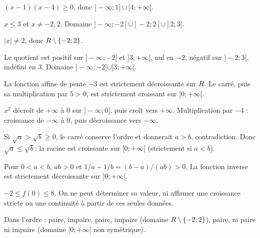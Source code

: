 \begin{corrige}\label{sol-t11s-c01-e09}$(x-1)(x-4)\ge0$, donc $]-\infty;1]\cup[4;+\infty[$.
\end{corrige}
\begin{corrige}\label{sol-t11s-c01-e10}$x\le3$ et $x\ne-2,2$. Domaine $]-\infty;-2[\cup]-2;2[\cup]2;3]$.
\end{corrige}
\begin{corrige}\label{sol-t11s-c01-e11}$|x|\ne2$, donc $R\setminus\{-2;2\}$.
\end{corrige}
\begin{corrige}\label{sol-t11s-c01-e12}Le quotient est positif sur $]-\infty;-2[$ et $]3;+\infty[$, nul en $-2$, négatif sur $]-2;3[$, indéfini en $3$. Domaine $]-\infty;-2]\cup]3;+\infty[$.
\end{corrige}
\begin{corrige}\label{sol-t11s-c01-e13}La fonction affine de pente $-3$ est strictement décroissante sur $R$. Le carré, puis sa multiplication par $5>0$, est strictement croissant sur $[0;+\infty[$.
\end{corrige}
\begin{corrige}\label{sol-t11s-c01-e14}$x^2$ décroît de $+\infty$ à $0$ sur $]-\infty;0]$, puis croît vers $+\infty$. Multiplication par $-4$ : croissance de $-\infty$ à $0$, puis décroissance vers $-\infty$.
\end{corrige}
\begin{corrige}\label{sol-t11s-c01-e15}Si $\sqrt a>\sqrt b\ge0$, le carré conserve l’ordre et donnerait $a>b$, contradiction. Donc $\sqrt a\le\sqrt b$; la racine est croissante sur $[0;+\infty[$ (strictement si $a<b$).
\end{corrige}
\begin{corrige}\label{sol-t11s-c01-e16}Pour $0<a<b$, $ab>0$ et $1/a-1/b=(b-a)/(ab)>0$. La fonction inverse est strictement décroissante sur $]0;+\infty[$.
\end{corrige}
\begin{corrige}\label{sol-t11s-c01-e17}$-2\le f(0)\le8$. On ne peut déterminer sa valeur, ni affirmer une croissance stricte ou une continuité à partir de ces seules données.
\end{corrige}
\begin{corrige}\label{sol-t11s-c01-e18}Dans l’ordre : paire, impaire, paire, impaire (domaine $R\setminus\{-2;2\}$), paire, ni paire ni impaire (domaine $[0;+\infty[$ non symétrique).
\end{corrige}
